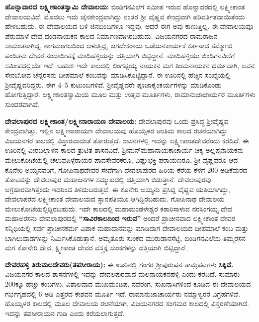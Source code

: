 \textbf{ಹೊನ್ನಾವಾರದ ಲಕ್ಷ್ಮೀಕಾಂತಸ್ವಾಮಿ ದೇವಾಲಯ:} ಬಿಂಡಿಗನವಿಲೆಗೆ ಸಮೀಪ ಇರುವ ಹೊನ್ನಾವರದಲ್ಲಿ ಲಕ್ಷ್ಮೀಕಾಂತ ದೇವಾಲಯವಿದೆ. ಮೊದಲು ಇದು ಜೈನಕೇಂದ್ರವಾಗಿದ್ದು ನಂತರ ಶ‍್ರೀ ವೈಷ್ಣವ ಕೇಂದ್ರವಾಗಿ ಪರಿವರ್ತಿತವಾಯಿತೆಂದು ಹೇಳಬಹುದು. ಈ ದೇವಾಲಯದ ಬಳಿ ಜಿನಬಿಂಬಗಳೂ ಇದ್ದವು. ಆದರೆ ಈಗ ಅವು ಕಾಣುತ್ತಿಲ್ಲ. ಈ ದೇವಾಲಯವೂ ಪೆರುಮಾಳೆ ದೇವ ದಂಡನಾಯಕನ ಕಾಲದ ನಿರ್ಮಾಣವಾಗಿರಬಹುದು. ವಿಜಯನಗರದ ರಾಮರಾಜನ ಸಾಮಂತನಾಗಿದ್ದ, ನಾಗಮಂಗಲದಿಂದ ಆಳುತ್ತಿದ್ದ, ಜಗದೇಕರಾಯ ಒಡೆಯನಕಾರ್ಯಕೆ ಕರ್ತನಾದ ತಮ್ಮೋಜಿ ಪಂಡಿತನು ದೇವರ ನಂದಾದೀಪಕ್ಕೆ ಮಾದಿಹಳ್ಳಿಯನ್ನು ದತ್ತಿಯಾಗಿ ಬಿಟ್ಟಿದ್ದಾನೆ. ಮಾದಿಹಳ್ಳಿಯು ಬಿಂಡಿಗನವಿಲೆಗೆ ಸಮೀಪದಲ್ಲಿಯೇ ಇದೆ. ಬಹುಶಃ ಇದೇ ಕಾಲದಲ್ಲಿ ಲಿಂಗಪ್ಪಯ್ಯ ನಾಯಕನ ಮಗ ತಿಂಮನಾಯಕನ ಧರ್ಮವಾಗಿ, ಅವನ ಸೇನಬೋವ ಚೆನ್ನರಸನು ದೀಪಮಾಲೆ ಕಂಬವನ್ನು ಮಾಡಿಸಿಕೊಟ್ಟಿದ್ದಾನೆ. ಈ ಊರಿನಲ್ಲಿ ಹೆಚ್ಚಿನ ಸಂಖ್ಯೆಯಲ್ಲಿ ಶ‍್ರೀವೈಷ್ಣವರಿದ್ದರು. ಈಗ 4–5 ಕುಟುಂಬಗಳಿವೆ. ಶ‍್ರೀವೈಷ್ಣವರೇ ಪೂಜಾಕೈಂಕರ್ಯಗಳನ್ನು ಮಾಡಿಕೊಂಡು ಹೋಗುತ್ತಿದ್ದಾರೆ. ಲಕ್ಷ್ಮೀಕಾಂತಸ್ವಾಮಿಯ ಮೂಲ ಮತ್ತು ಉತ್ಸವ ಮೂರ್ತಿಗಳು, ರಾಮಾನುಜಾಚಾರ್ಯರ ಮೂರ್ತಿಗಳು ಸುಂದರವಾಗಿವೆ.

\textbf{ದೇವಲಾಪುರದ ಲಕ್ಷ್ಮೀಕಾಂತ/ಲಕ್ಷ್ಮೀನಾರಾಯಣ ದೇವಾಲಯ:} ದೇವಲಾಪುರವು ಒಂದು ಪ್ರಸಿದ್ಧ ಶ‍್ರೀವೈಷ್ಣವ ಕೇಂದ್ರವಾಗಿತ್ತು. ಇಲ್ಲಿನ ಲಕ್ಷ್ಮೀನಾರಾಯಣ ದೇವಾಲಯವು ಹೊಯ್ಸಳರ ಅಂತಿಮ ಕಾಲದ ರಚನೆಯಾಗಿದ್ದು ವಿಜಯನಗರ ಕಾಲದಲ್ಲಿ ವಿಸ್ತಾರವಾದಂತೆ ತೋರುತ್ತದೆ. ಶಾಸನಗಳಲ್ಲಿ ಇದನ್ನು ಲಕ್ಷ್ಮೀಕಾಂತದೇವರೆಂದು ಕರೆದಿದೆ. ಈ ಊರಿನಲ್ಲಿ ವೀರಬಲ್ಲಾಳನ ಕಾಲದ ತ್ರುಟಿತ ಶಾಸನವಿದೆ. ಶ‍್ರೀಮನ್​ ಮಹಾನಾಯಕಾಚಾರ್ಯ ಚಿಕ್ಕ ಅಲ್ಲಪ್ಪನಾಯಕನು ಮೇಲುಕೋಟೆಯಲ್ಲಿ ಚೆಲುವಪಿಳ್ಳೆರಾಯರ ಪಾದಸೇವರಕರೂ, ವಿಷ್ಣುಭಕ್ತಿ ಪರಾಯಣರೂ, ಶ‍್ರೀ ವೈಷ್ಣವರೂ ಆದ ಕೊನೇರಿ ಅಯ್ಯನವರಿಗೆ, ಗೋಪಿನಾಥದೇವರ ಸೇವೆಗಾಗಿ ದೇವಲಾಪುರದ ಹಿರಿಯ ಕೆರೆಯ ಕೆಳಗೆ 200 ಅಡಿಕೆಮರದ ತೋಟವನ್ನು ದೇವಲಾಪುರ ಮಹಾಜನಗಳ ಸಮ್ಮುಖದಲ್ಲಿ ದತ್ತಿಯಾಗಿ ಬಿಡುತ್ತಾನೆ. ದೇವಲಾಪುರವು ಅಗ್ರಹಾರವಾಗಿತ್ತೆಂದು ಇದರಿಂದ ತಿಳಿದುಬರುತ್ತದೆ. ಈ ಕೊನೇರಿ ಅಯ್ಯನು ಪ್ರಸಿದ್ದ ವೈಷ್ಣವ ಯತಿಯಾಗಿದ್ದು, ದೇವಲಾಪರದ ಲಕ್ಷ್ಮೀಕಾಂತ ದೇವಾಲಯದ ಸ್ಥಾನಪತಿಯೂ ಆಗಿದ್ದಿರಬಹುದು. ಗೋಪಿನಾಥ ದೇವಾಲಯ ಮೇಲುಕೋಟೆಯಲ್ಲಿದ್ದಿರಬಹುದು. ಇದೇ ಕಾಲದಲ್ಲಿ ಮಹಾಮಂಡಳೇಶ್ವರ ಕಠಾರಿಸಾಳುವ ನರಸಿಂಗಯ್ಯ ದೇವ ಮಹಾಅರಸನು ದೇವಲಾಪುರದಲ್ಲಿ \textbf{“ಸಾವಿರಕಾಲದಿಂದ ಇರುವ”} ಅಂದರೆ ಪ್ರಾಚೀನವಾದ ಲಕ್ಷ್ಮೀಕಾಂತ ದೇವರ ಸನ್ನಿಧಿಯಲ್ಲಿ ಸರ್ವ ಪ್ರಾಚೀನಕರ್ಮ ವಿಪಾಕ ಮಹಾದಾನವನ್ನು ಮಾಡಿದಾಗ ದೇವಾಲಯದ ದೀಪಮಾಲೆ ಕಂಬ ಮತ್ತು ಬಾಗಿಲುವಾಡಗಳನ್ನು ನಿರ್ಮಿಸಿಕೊಡುತ್ತಾನೆ. ಅಮೃತೂರು ಸುಂಕದ ಮುರುಡಾನಸೆಟ್ಟಿ, ಬಿಂಡಿಗನವಿಲೆಯ ತಿಮ್ಮರಸನ ಮಗ ಕೋನೇರಿ ದೇವ, ಕ್ಷ್ಮೀಕಾಂತ ದೇವರ ವಸ್ತ್ರಕ್ಕೆ ಸುಂಕಗಳನ್ನು ದತ್ತಿಯಾಗಿ ಬಿಟ್ಟಿದ್ದಾರೆ. 

\textbf{ದೇವರಹಳ್ಳಿ ತಿರುಮಲದೇವರು(ತಪಸೀರಾಯ):} ಈ ಊರಿನಲ್ಲಿ ಗಂಗರ ಶ‍್ರೀಪುರುಷನ ತಾಮ್ರಪಟಗಳು\textbf{ ಸಿಕ್ಕಿವೆ. }ವಿಜಯನಗರ ಕಾಲದ ಶಾಸನಗಳಲ್ಲಿ ಇದನ್ನು ದೇವಲಪುರವಾದ ಮಲನಾಯಕನಹಳ್ಳಿ ಎಂದು ಕರೆದಿದೆ. ಸುಮಾರು 200ಕ್ಕೂ ಹೆಚ್ಚು ಕಂಬಗಳು, ವಿಶಾಲವಾದ ಮುಖಮಂಟಪ, ನವರಂಗ, ಸುಖನಾಸಿಗಳಿಂದ ಕೂಡಿದ ಈ ದೇವಾಲಯದ ಗರ್ಭಗೃಹದಲ್ಲಿ 6 ಅಡಿ ಎತ್ತರದ ಕೇಶವನ ಮೂರ್ತಿ ಇದೆ. ರಾಮಾನುಜಾಚಾರ್ಯರು ನಮ್ಮಾಳ್ವರರ ವಿಗ್ರಹಗಳಿವೆ. ಹೊಯ್ಸಳರ ಕಾಲದಲ್ಲಿ ಮೂಲ ದೇವಾಲಯ ರಚನೆಯಾಗಿ, ವಿಜಯನಗರದ ಸಂಗಮರ ಕಾಲದಲ್ಲಿ ವಿಸ್ತರಣೆಯಾಗಿದೆ. ಇದನ್ನು ತಪಸೀರಾಯನ ಗುಡಿ ಎಂದು ಕರೆಯಲಾಗುತ್ತದೆ. 

